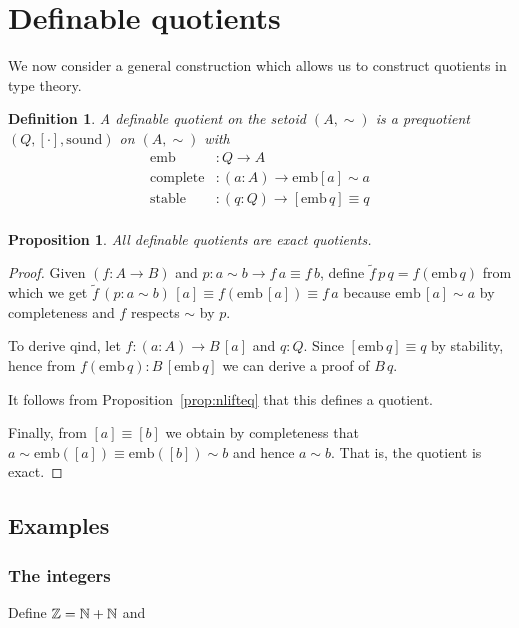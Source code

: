 \documentclass[preprint,12pt]{elsarticle}
\newtheorem{definition}{Definition}[section]
\newtheorem{proposition}{Proposition}[section]
\newtheorem{proof}{Proof}[section]
\newcommand{\bocks}[1]{[#1]}
\newcommand{\nlift}[1]{\tilde{#1}}
\newcommand{\sound}{\mathrm{sound}}
\newcommand{\qind}{\mathrm{qind}}
\newcommand{\emb}{\mathrm{emb}}
\newcommand{\compl}{\mathrm{complete}}
\newcommand{\stable}{\mathrm{stable}}
\newcommand{\Z}{\mathbb{Z}}
\begin{document}
\section{Definable quotients\\ }\label{sec:defquotients}

We now consider a general construction which allows us to construct quotients in type theory.

\begin{definition}\label{def:defquotients}
A \emph{definable quotient} on the setoid $(A,\sim)$ is a prequotient $(Q,\bocks\cdot,\sound)$ on $(A,\sim)$ with
\begin{align*}
\emb &: Q \to A\\
\compl &: (a : A) \to \emb {\bocks a} \sim a\\
\stable &: (q:Q) \to \bocks{\emb\,q} \equiv q\\
\end{align*}
\end{definition}

\begin{proposition}
All definable quotients are exact quotients.
\end{proposition}
\begin{proof}

Given $(f\colon A \to B)$ and $p : a\sim b \to f\,a \equiv f\,b$, define $\nlift f\, p \,q = f (\emb\,q)$ from which we get $\nlift f \,(p : a \sim b)\,\bocks a\equiv f(\emb\,\bocks a)\equiv f\,a$ because $\emb\,\bocks a\sim a$ by completeness and $f$ respects $\sim$ by $p$. 

To derive $\qind$, let $f:(a\colon A)\to B\,\bocks a$ and $q:Q$. Since $ \bocks{\emb\,q} \equiv q$ by stability, hence from $f (\emb\,q):B\,\bocks{\emb\,q}$ we can derive a proof of $B\,q$. 

It follows from Proposition~\ref{prop:nlifteq} that this defines a quotient. 

Finally, from $\bocks a \equiv \bocks b$ 
we obtain by completeness that $a\sim\emb(\bocks a)\equiv\emb(\bocks b)\sim b$ and hence $a\sim b$. That is, the quotient is exact.
\end{proof}
\subsection{Examples}\label{sec:dquotients:examples}
\subsubsection*{The integers}
Define $\Z =\nat + \nat $ and 
\end{document}
